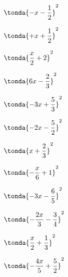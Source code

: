 \begin{esercizio}
\begin{htmulticols}{4}
\begin{enumeratea}
\item \(\tonda{- x - \dfrac{1}{2}}^{2}\) %
\item \(\tonda{+ x + \dfrac{1}{2}}^{2}\) %
\item \(\tonda{\dfrac{x}{2} + 2}^{2}\) %
\item \(\tonda{6 x - \dfrac{2}{3}}^{2}\) %
\item \(\tonda{- 3 x + \dfrac{5}{3}}^{2}\) %
\item \(\tonda{- 2 x - \dfrac{5}{2}}^{2}\) %
\item \(\tonda{x + \dfrac{2}{3}}^{2}\) %
\item \(\tonda{- \dfrac{x}{6} + 1}^{2}\) %
\item \(\tonda{- 3 x - \dfrac{6}{5}}^{2}\) %
\item \(\tonda{- \dfrac{2 x}{3} - \dfrac{3}{4}}^{2}\) %
\item \(\tonda{\dfrac{x}{2} + \dfrac{1}{3}}^{2}\) %
\item \(\tonda{- \dfrac{4 x}{5} + \dfrac{5}{2}}^{2}\) %

\end{enumeratea}
\end{htmulticols}
\end{esercizio}
